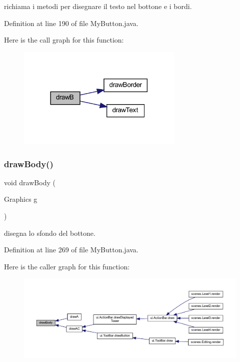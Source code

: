 richiama i metodi per disegnare il testo nel bottone e i bordi. 



Definition at line 190 of file My\+Button.\+java.

Here is the call graph for this function\+:\nopagebreak
\begin{figure}[H]
\begin{center}
\leavevmode
\includegraphics[width=225pt]{classui_1_1_my_button_a85f135df7a0669cda6dcdf8ca393a90c_cgraph}
\end{center}
\end{figure}
\mbox{\label{classui_1_1_my_button_a1e330b5600a9187ca0ef7f964cfb24c9}} 
\subsubsection{\texorpdfstring{draw\+Body()}{drawBody()}}
{\footnotesize\ttfamily void draw\+Body (\begin{DoxyParamCaption}\item[{Graphics}]{g }\end{DoxyParamCaption})\hspace{0.3cm}{\ttfamily [private]}}



disegna lo sfondo del bottone. 



Definition at line 269 of file My\+Button.\+java.

Here is the caller graph for this function\+:\nopagebreak
\begin{figure}[H]
\begin{center}
\leavevmode
\includegraphics[width=350pt]{classui_1_1_my_button_a1e330b5600a9187ca0ef7f964cfb24c9_icgraph}
\end{center}
\end{figure}
\mbox{\label{classui_1_1_my_button_af91752554b78073a295ed441afc34638}} 
